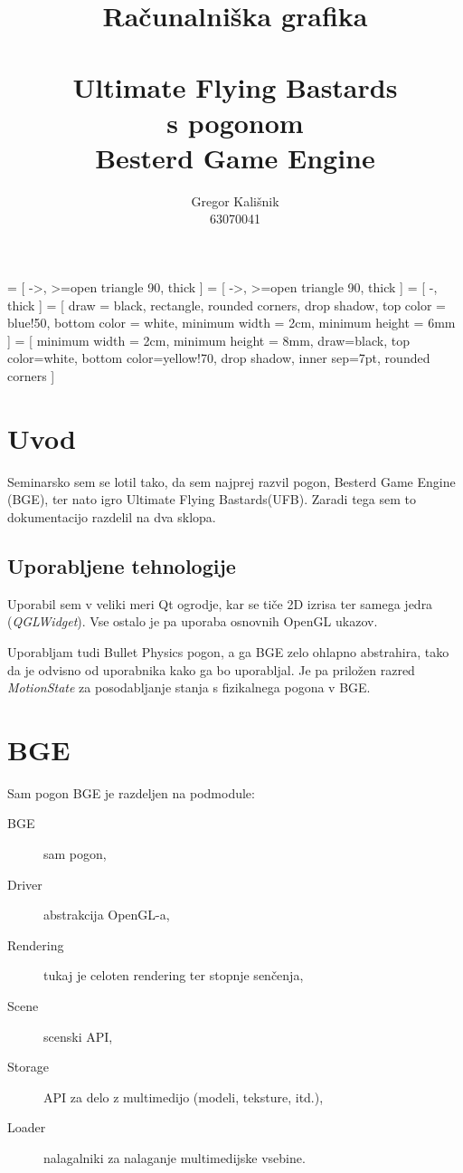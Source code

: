 \documentclass[a4paper]{article}
\author{Gregor Kališnik\\63070041}
\title{Računalniška grafika\\\ \\Ultimate Flying Bastards\\s pogonom\\Besterd Game Engine}
\begin{document}
 = [
  ->,
  >=open triangle 90,
  thick
]
 = [
  ->,
  >=open triangle 90,
  thick
]
 = [
  -,
  thick
]
 = [
  draw = black,
  rectangle,
  rounded corners,
  drop shadow,
  top color = blue!50,
  bottom color = white,
  minimum width = 2cm,
  minimum height = 6mm
]
 = [
  minimum width = 2cm,
  minimum height = 8mm,
  draw=black,
  top color=white,
  bottom color=yellow!70,
  drop shadow,
  inner sep=7pt,
  rounded corners
]

\maketitle
\pagebreak
\tableofcontents
\pagebreak
\listoffigures
\pagebreak

\section{Uvod}
Seminarsko sem se lotil tako, da sem najprej razvil pogon, Besterd Game Engine (BGE), ter nato igro Ultimate Flying Bastards(UFB). Zaradi tega sem to dokumentacijo razdelil na dva sklopa.

\subsection{Uporabljene tehnologije}
Uporabil sem v veliki meri Qt ogrodje, kar se tiče 2D izrisa ter samega jedra (\emph{QGLWidget}). Vse ostalo je pa uporaba osnovnih OpenGL ukazov.

Uporabljam tudi Bullet Physics pogon, a ga BGE zelo ohlapno abstrahira, tako da je odvisno od uporabnika kako ga bo uporabljal. Je pa priložen razred \emph{MotionState} za posodabljanje stanja s fizikalnega pogona v BGE.

\section{BGE}
Sam pogon BGE je razdeljen na podmodule:
\begin{description}
  \item[BGE] sam pogon,
  \item[Driver] abstrakcija OpenGL-a,
  \item[Rendering] tukaj je celoten rendering ter stopnje senčenja,
  \item[Scene] scenski API,
  \item[Storage] API za delo z multimedijo (modeli, teksture, itd.),
  \item[Loader] nalagalniki za nalaganje multimedijske vsebine.
\end{description}
\end{document}
